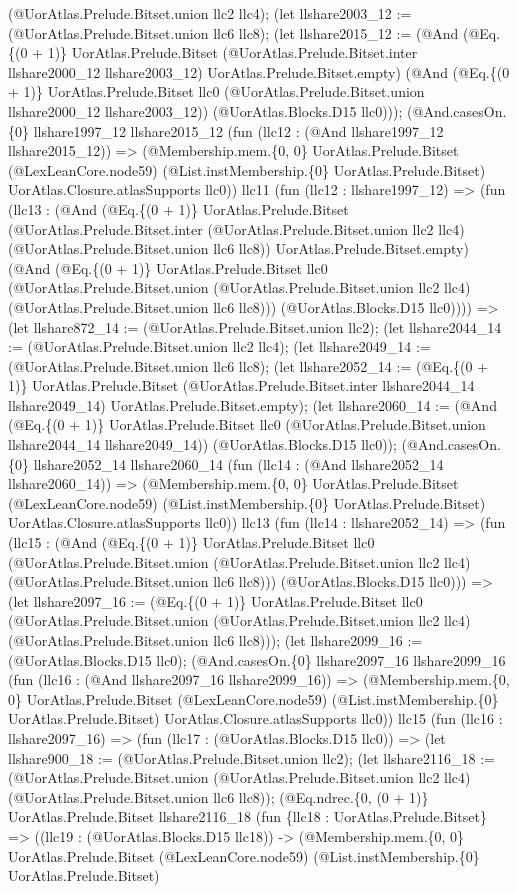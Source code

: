 \documentclass[11pt]{article}
\begin{document}
(@UorAtlas.Prelude.Bitset.union llc2 llc4); (let llshare2003\_12 := (@UorAtlas.Prelude.Bitset.union llc6 llc8); (let llshare2015\_12 := (@And (@Eq.\{(0 + 1)\} UorAtlas.Prelude.Bitset (@UorAtlas.Prelude.Bitset.inter llshare2000\_12 llshare2003\_12) UorAtlas.Prelude.Bitset.empty) (@And (@Eq.\{(0 + 1)\} UorAtlas.Prelude.Bitset llc0 (@UorAtlas.Prelude.Bitset.union llshare2000\_12 llshare2003\_12)) (@UorAtlas.Blocks.D15 llc0))); (@And.casesOn.\{0\} llshare1997\_12 llshare2015\_12 (fun (llc12 : (@And llshare1997\_12 llshare2015\_12)) => (@Membership.mem.\{0, 0\} UorAtlas.Prelude.Bitset (@LexLeanCore.node59) (@List.instMembership.\{0\} UorAtlas.Prelude.Bitset) UorAtlas.Closure.atlasSupports llc0)) llc11 (fun (llc12 : llshare1997\_12) => (fun (llc13 : (@And (@Eq.\{(0 + 1)\} UorAtlas.Prelude.Bitset (@UorAtlas.Prelude.Bitset.inter (@UorAtlas.Prelude.Bitset.union llc2 llc4) (@UorAtlas.Prelude.Bitset.union llc6 llc8)) UorAtlas.Prelude.Bitset.empty) (@And (@Eq.\{(0 + 1)\} UorAtlas.Prelude.Bitset llc0 (@UorAtlas.Prelude.Bitset.union (@UorAtlas.Prelude.Bitset.union llc2 llc4) (@UorAtlas.Prelude.Bitset.union llc6 llc8))) (@UorAtlas.Blocks.D15 llc0)))) => (let llshare872\_14 := (@UorAtlas.Prelude.Bitset.union llc2); (let llshare2044\_14 := (@UorAtlas.Prelude.Bitset.union llc2 llc4); (let llshare2049\_14 := (@UorAtlas.Prelude.Bitset.union llc6 llc8); (let llshare2052\_14 := (@Eq.\{(0 + 1)\} UorAtlas.Prelude.Bitset (@UorAtlas.Prelude.Bitset.inter llshare2044\_14 llshare2049\_14) UorAtlas.Prelude.Bitset.empty); (let llshare2060\_14 := (@And (@Eq.\{(0 + 1)\} UorAtlas.Prelude.Bitset llc0 (@UorAtlas.Prelude.Bitset.union llshare2044\_14 llshare2049\_14)) (@UorAtlas.Blocks.D15 llc0)); (@And.casesOn.\{0\} llshare2052\_14 llshare2060\_14 (fun (llc14 : (@And llshare2052\_14 llshare2060\_14)) => (@Membership.mem.\{0, 0\} UorAtlas.Prelude.Bitset (@LexLeanCore.node59) (@List.instMembership.\{0\} UorAtlas.Prelude.Bitset) UorAtlas.Closure.atlasSupports llc0)) llc13 (fun (llc14 : llshare2052\_14) => (fun (llc15 : (@And (@Eq.\{(0 + 1)\} UorAtlas.Prelude.Bitset llc0 (@UorAtlas.Prelude.Bitset.union (@UorAtlas.Prelude.Bitset.union llc2 llc4) (@UorAtlas.Prelude.Bitset.union llc6 llc8))) (@UorAtlas.Blocks.D15 llc0))) => (let llshare2097\_16 := (@Eq.\{(0 + 1)\} UorAtlas.Prelude.Bitset llc0 (@UorAtlas.Prelude.Bitset.union (@UorAtlas.Prelude.Bitset.union llc2 llc4) (@UorAtlas.Prelude.Bitset.union llc6 llc8))); (let llshare2099\_16 := (@UorAtlas.Blocks.D15 llc0); (@And.casesOn.\{0\} llshare2097\_16 llshare2099\_16 (fun (llc16 : (@And llshare2097\_16 llshare2099\_16)) => (@Membership.mem.\{0, 0\} UorAtlas.Prelude.Bitset (@LexLeanCore.node59) (@List.instMembership.\{0\} UorAtlas.Prelude.Bitset) UorAtlas.Closure.atlasSupports llc0)) llc15 (fun (llc16 : llshare2097\_16) => (fun (llc17 : (@UorAtlas.Blocks.D15 llc0)) => (let llshare900\_18 := (@UorAtlas.Prelude.Bitset.union llc2); (let llshare2116\_18 := (@UorAtlas.Prelude.Bitset.union (@UorAtlas.Prelude.Bitset.union llc2 llc4) (@UorAtlas.Prelude.Bitset.union llc6 llc8)); (@Eq.ndrec.\{0, (0 + 1)\} UorAtlas.Prelude.Bitset llshare2116\_18 (fun \{llc18 : UorAtlas.Prelude.Bitset\} => ((llc19 : (@UorAtlas.Blocks.D15 llc18)) -> (@Membership.mem.\{0, 0\} UorAtlas.Prelude.Bitset (@LexLeanCore.node59) (@List.instMembership.\{0\} UorAtlas.Prelude.Bitset) 
\end{document}
